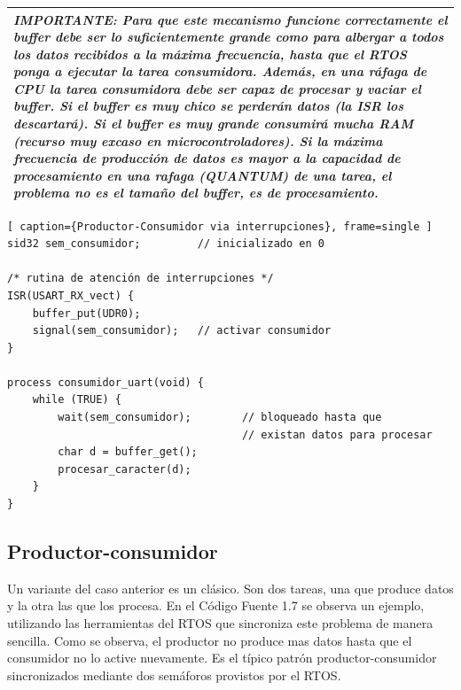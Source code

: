 \documentclass[output=paper, 
colorlinks,
citecolor=brown,
newtxmath
]{langscibook}
\begin{document}
\begin{center}
\begin{tabularx}{\textwidth}{|X|}
\hline
\rowcolor{aliceblue}
\textit{
IMPORTANTE: Para que este mecanismo funcione correctamente el buffer debe 
ser lo suficientemente grande como para albergar
a todos los datos recibidos a la máxima frecuencia, hasta que el RTOS
ponga a ejecutar la tarea consumidora. Además, en una ráfaga de CPU la
tarea consumidora debe ser capaz de procesar y vaciar el buffer.
Si el buffer es muy chico se perderán datos (la ISR los descartará).
Si el buffer es muy grande consumirá mucha RAM (recurso muy excaso en 
microcontroladores). Si la máxima frecuencia de producción de datos es mayor
a la capacidad de procesamiento en una rafaga (QUANTUM) de una tarea, 
el problema no es el tamaño del buffer, es de procesamiento.
} \\
\hline
\end{tabularx}
\end{center}

\begin{lstlisting}[ caption={Productor-Consumidor via interrupciones}, frame=single ]
sid32 sem_consumidor;         // inicializado en 0

/* rutina de atención de interrupciones */
ISR(USART_RX_vect) {
    buffer_put(UDR0);
    signal(sem_consumidor);   // activar consumidor
}

process consumidor_uart(void) {
    while (TRUE) {
        wait(sem_consumidor);        // bloqueado hasta que 
                                     // existan datos para procesar
        char d = buffer_get();
        procesar_caracter(d);
    }
}
\end{lstlisting}



\subsection{Productor-consumidor}

Un variante del caso anterior es un clásico. Son dos tareas, una
que produce datos y la otra las que los procesa.
En el Código Fuente 1.7 se observa un ejemplo, utilizando las herramientas del RTOS
que sincroniza este problema de manera sencilla.
Como se observa, el productor no produce mas datos hasta que el consumidor
no lo active nuevamente. Es el típico patrón productor-consumidor 
sincronizados mediante dos semáforos provistos por el RTOS.
\end{document}
